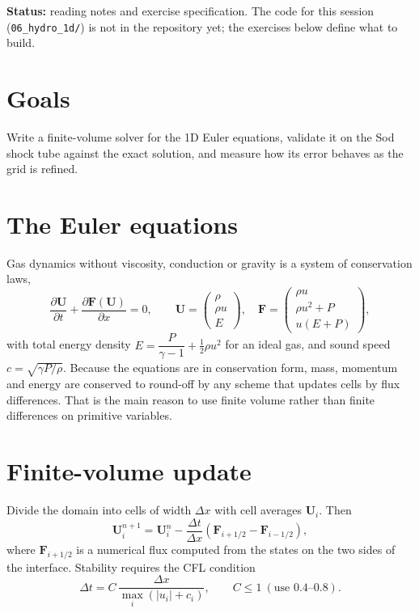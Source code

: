 


\textbf{Status:} reading notes and exercise specification. The code for this session (\texttt{06\_hydro\_1d/}) is not in the repository yet; the exercises below define what to build.

\section*{Goals}
Write a finite-volume solver for the 1D Euler equations, validate it on the Sod shock tube against the exact solution, and measure how its error behaves as the grid is refined.

\section{The Euler equations}
Gas dynamics without viscosity, conduction or gravity is a system of conservation laws,
\[
\frac{\partial\mathbf U}{\partial t}+\frac{\partial\mathbf F(\mathbf U)}{\partial x}=0,
\qquad
\mathbf U=\begin{pmatrix}\rho\\ \rho u\\ E\end{pmatrix},\quad
\mathbf F=\begin{pmatrix}\rho u\\ \rho u^2+P\\ u(E+P)\end{pmatrix},
\]
with total energy density $E=\dfrac{P}{\gamma-1}+\tfrac12\rho u^2$ for an ideal gas, and sound speed $c=\sqrt{\gamma P/\rho}$. Because the equations are in conservation form, mass, momentum and energy are conserved to round-off by any scheme that updates cells by flux differences. That is the main reason to use finite volume rather than finite differences on primitive variables.

\section{Finite-volume update}
Divide the domain into cells of width $\Delta x$ with cell averages $\mathbf U_i$. Then
\[
\mathbf U_i^{n+1}=\mathbf U_i^n-\frac{\Delta t}{\Delta x}\left(\mathbf F_{i+1/2}-\mathbf F_{i-1/2}\right),
\]
where $\mathbf F_{i+1/2}$ is a numerical flux computed from the states on the two sides of the interface. Stability requires the CFL condition
\[
\Delta t=C\,\frac{\Delta x}{\max_i\left(|u_i|+c_i\right)},\qquad C\le1 \ (\text{use }0.4\text{--}0.8).
\]

